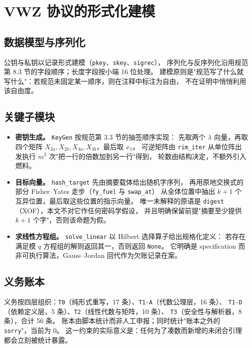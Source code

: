 \documentclass[UTF8,fontset=windows,zihao=-4,a4paper]{ctexart}
\newcommand{\code}[1]{\texttt{#1}}
\begin{document}
\section{VWZ 协议的形式化建模}

\subsection{数据模型与序列化}
公钥与私钥以记录形式建模（\code{pkey}、\code{skey}、\code{sigrec}），
序列化与反序列化沿用规范第 8.3 节的字段顺序；长度字段按小端 16 位处理。
建模原则是"规范写了什么就写什么"：若规范未固定某一顺序，则在注释中标注为自由，
不在证明中悄悄利用该自由度。

\subsection{关键子模块}
\begin{itemize}
  \item \textbf{密钥生成。} \code{KeyGen} 按规范第 3.3 节的抽签顺序实现：
        先取两个 $\lambda$ 向量，再取四个矩阵 $X_{2a},X_{2b},X_{3a},X_{3b}$，最后取 $x_1$。
        可逆矩阵由 \code{rim\_iter} 从单位阵出发执行 $m^2$ 次"把一行的倍数加到另一行"得到，
        轮数由结构决定，不额外引入燃料。
  \item \textbf{目标向量。} \code{hash\_target} 先由摘要载体给出随机字序列，
        再用原地交换式的部分 Fisher--Yates 走步（\code{fy\_fuel} 与 \code{swap\_at}）
        从全体位置中抽出 $k+1$ 个互异位置，最后取这些位置的指示向量。
        唯一未解释的原语是 \code{digest}（XOF），本文不对它作任何密码学假设，
        并且明确保留前提"摘要至少提供 $k+1$ 个字"，否则该命题为假。
  \item \textbf{求线性方程组。} \code{solve\_linear} 以 Hilbert 选择算子给出规格化定义：
        若存在满足模 $q$ 方程组的解则返回其一，否则返回 \code{None}。
        它明确是 specification 而非可执行算法，Gauss--Jordan 回代作为欠账记录在案。
\end{itemize}

\subsection{义务账本}
义务按四层组织：\code{T0}（纯形式重写，17 条）、\code{T1-A}（代数公理层，16 条）、
\code{T1-D}（依赖定义层，5 条）、\code{T2}（线性代数与矩阵，10 条）、
\code{T3}（安全性与解析器，8 条），合计 56 条。
账本由脚本统计而非人工申报；同时统计"账本之外的 \code{sorry}"，当前为 0。
这一约束的实际意义是：任何为了凑数而新增的未闭合引理都会立刻被统计暴露。
\end{document}
